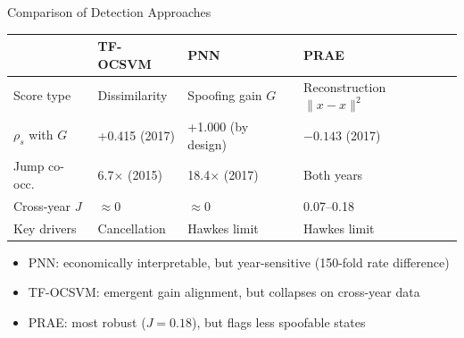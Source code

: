 \documentclass{beamer}
\begin{document}
\begin{frame}{Comparison of Detection Approaches}
    \begin{table}[h]
    \centering
    \footnotesize
    \begin{tabular}{lp{2.5cm}p{2.5cm}p{2.5cm}}
    \toprule
    & \textbf{TF-OCSVM} & \textbf{PNN} & \textbf{PRAE} \\
    \midrule
    Score type     & Dissimilarity       & Spoofing gain $G$    & Reconstruction $\|x - \hat{x}\|^2$ \\
    $\rho_s$ with $G$ & +0.415 (2017)    & +1.000 (by design)  & $-0.143$ (2017) \\
    Jump co-occ.   & 6.7$\times$ (2015)   & 18.4$\times$ (2017) & Both years \\
    Cross-year $J$ & $\approx 0$          & $\approx 0$          & 0.07--0.18 \\
    Key drivers    & Cancellation         & Hawkes limit         & Hawkes limit \\
    \bottomrule
    \end{tabular}
    \end{table}
    \vspace{0.15cm}
    \begin{itemize}
        \item PNN: economically interpretable, but year-sensitive (150-fold rate difference)
        \item TF-OCSVM: emergent gain alignment, but collapses on cross-year data
        \item PRAE: most robust ($J{=}0.18$), but flags less spoofable states
    \end{itemize}
\end{frame}
\end{document}
